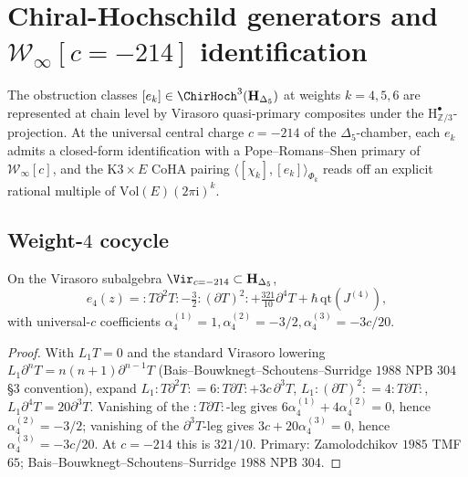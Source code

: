 \section{Chiral-Hochschild generators and \texorpdfstring{$\mathcal W_\infty[c=-214]$}{W-inf[c=-214]} identification}
\label{sec:ek-winfinity-ident}

The obstruction classes $[e_k]\in\ChirHoch^3(\mathbf H_{\Delta_5})$ at
weights $k=4,5,6$ are represented at chain level by Virasoro
quasi-primary composites under the $\mathrm{H}^\bullet_{\mathbb{Z}/3}$-projection. At the
universal central charge $c=-214$ of the $\Delta_5$-chamber, each
$e_k$ admits a closed-form identification with a Pope--Romans--Shen
primary of $\mathcal W_\infty[c]$, and the K$3\times E$ CoHA pairing
$\langle[\chi_k],[e_k]\rangle_{\Phi_k}$ reads off an explicit rational
multiple of $\mathrm{Vol}(E)(2\pi\mathrm i)^k$.

\subsection{Weight-\texorpdfstring{$4$}{4} cocycle}
\label{subsec:e4-calculus}

\begin{theorem}
\label{thm:e4-calculus-vol3}
On the Virasoro subalgebra $\Vir_{c=-214}\subset\mathbf H_{\Delta_5}$,
\begin{equation}
\label{eq:e4-calculus-vol3}
e_4(z)={:}T\partial^2T{:}-\tfrac{3}{2}{:}(\partial T)^2{:}
 +\tfrac{321}{10}\partial^4T+\hbar\,\mathrm{qt}(J^{(4)}),
\end{equation}
with universal-$c$ coefficients
$\alpha_4^{(1)}=1,\alpha_4^{(2)}=-3/2,\alpha_4^{(3)}=-3c/20$.
\end{theorem}

\begin{proof}
With $L_1T=0$ and the standard Virasoro lowering
$L_1\partial^nT=n(n+1)\partial^{n-1}T$ (Bais--Bouwknegt--Schoutens--Surridge
$1988$ NPB $304$ \S3 convention), expand
$L_1{:}T\partial^2T{:}=6{:}T\partial T{:}+3c\,\partial^3T$,
$L_1{:}(\partial T)^2{:}=4{:}T\partial T{:}$,
$L_1\partial^4T=20\partial^3T$. Vanishing of the ${:}T\partial T{:}$-leg
gives $6\alpha_4^{(1)}+4\alpha_4^{(2)}=0$, hence
$\alpha_4^{(2)}=-3/2$; vanishing of the $\partial^3T$-leg gives
$3c+20\alpha_4^{(3)}=0$, hence $\alpha_4^{(3)}=-3c/20$. At $c=-214$
this is $321/10$. Primary: Zamolodchikov $1985$ TMF $65$;
Bais--Bouwknegt--Schoutens--Surridge $1988$ NPB $304$.
\end{proof}

